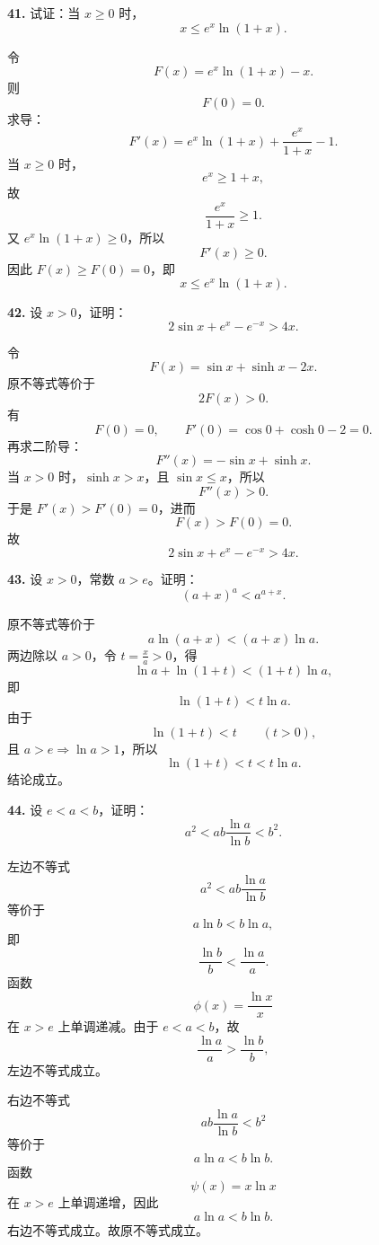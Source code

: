 \begin{problemblock}
\textbf{41.} 试证：当 \(x\ge0\) 时，
\[
x\le e^x\ln(1+x).
\]
\end{problemblock}

\begin{solutionblock}
令
\[
F(x)=e^x\ln(1+x)-x.
\]
则
\[
F(0)=0.
\]
求导：
\[
F'(x)=e^x\ln(1+x)+\frac{e^x}{1+x}-1.
\]
当 \(x\ge0\) 时，
\[
e^x\ge1+x,
\]
故
\[
\frac{e^x}{1+x}\ge1.
\]
又 \(e^x\ln(1+x)\ge0\)，所以
\[
F'(x)\ge0.
\]
因此 \(F(x)\ge F(0)=0\)，即
\[
x\le e^x\ln(1+x).
\]
\end{solutionblock}

\begin{problemblock}
\textbf{42.} 设 \(x>0\)，证明：
\[
2\sin x+e^x-e^{-x}>4x.
\]
\end{problemblock}

\begin{solutionblock}
令
\[
F(x)=\sin x+\sinh x-2x.
\]
原不等式等价于
\[
2F(x)>0.
\]
有
\[
F(0)=0,\qquad F'(0)=\cos0+\cosh0-2=0.
\]
再求二阶导：
\[
F''(x)=-\sin x+\sinh x.
\]
当 \(x>0\) 时，\(\sinh x>x\)，且 \(\sin x\le x\)，所以
\[
F''(x)>0.
\]
于是 \(F'(x)>F'(0)=0\)，进而
\[
F(x)>F(0)=0.
\]
故
\[
2\sin x+e^x-e^{-x}>4x.
\]
\end{solutionblock}

\begin{problemblock}
\textbf{43.} 设 \(x>0\)，常数 \(a>e\)。证明：
\[
(a+x)^a<a^{a+x}.
\]
\end{problemblock}

\begin{solutionblock}
原不等式等价于
\[
a\ln(a+x)<(a+x)\ln a.
\]
两边除以 \(a>0\)，令 \(t=\frac{x}{a}>0\)，得
\[
\ln a+\ln(1+t)<(1+t)\ln a,
\]
即
\[
\ln(1+t)<t\ln a.
\]
由于
\[
\ln(1+t)<t\qquad(t>0),
\]
且 \(a>e\Rightarrow \ln a>1\)，所以
\[
\ln(1+t)<t<t\ln a.
\]
结论成立。
\end{solutionblock}

\begin{problemblock}
\textbf{44.} 设 \(e<a<b\)，证明：
\[
a^2<ab\frac{\ln a}{\ln b}<b^2.
\]
\end{problemblock}

\begin{solutionblock}
左边不等式
\[
a^2<ab\frac{\ln a}{\ln b}
\]
等价于
\[
a\ln b<b\ln a,
\]
即
\[
\frac{\ln b}{b}<\frac{\ln a}{a}.
\]
函数
\[
\phi(x)=\frac{\ln x}{x}
\]
在 \(x>e\) 上单调递减。由于 \(e<a<b\)，故
\[
\frac{\ln a}{a}>\frac{\ln b}{b},
\]
左边不等式成立。

右边不等式
\[
ab\frac{\ln a}{\ln b}<b^2
\]
等价于
\[
a\ln a<b\ln b.
\]
函数
\[
\psi(x)=x\ln x
\]
在 \(x>e\) 上单调递增，因此
\[
a\ln a<b\ln b.
\]
右边不等式成立。故原不等式成立。
\end{solutionblock}

